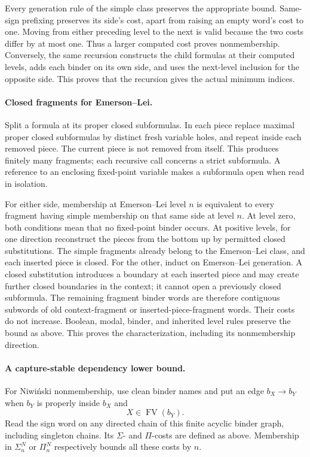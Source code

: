 Every generation rule of
the simple class preserves
the appropriate bound.
Same-sign prefixing preserves
its side's cost, apart
from raising an empty
word's cost to one.
Moving from either preceding
level to the next is valid
because the two costs differ
by at most one.
Thus a larger computed cost
proves nonmembership.
Conversely, the same recursion
constructs the child formulas
at their computed levels,
adds each binder on its
own side, and uses the
next-level inclusion for
the opposite side.
This proves that the
recursion gives the actual
minimum indices.

\paragraph{Closed fragments for Emerson--Lei.}
Split a formula at its
proper closed subformulas.
In each piece replace
maximal proper closed
subformulas by distinct
fresh variable holes, and
repeat inside each removed
piece. The current piece
is not removed from itself.
This produces finitely many
fragments; each recursive
call concerns a strict
subformula.
A reference to an enclosing
fixed-point variable makes
a subformula open when
read in isolation.

For either side, membership
at Emerson--Lei level \(n\)
is equivalent to every
fragment having simple
membership on that same
side at level \(n\).
At level zero, both conditions
mean that no fixed-point
binder occurs. At positive
levels, for one direction reconstruct
the pieces from the bottom
up by permitted closed
substitutions. The simple
fragments already belong
to the Emerson--Lei class,
and each inserted piece
is closed.
For the other, induct on
Emerson--Lei generation.
A closed substitution
introduces a boundary at
each inserted piece and
may create further closed
boundaries in the context;
it cannot open a previously
closed subformula.
The remaining fragment
binder words are therefore
contiguous subwords of old
context-fragment or inserted-piece-fragment
words. Their costs do
not increase. Boolean,
modal, binder, and inherited
level rules preserve the
bound as above.
This proves the characterization,
including its nonmembership
direction.

\paragraph{A capture-stable dependency lower bound.}
For Niwi\'nski nonmembership,
use clean binder names and
put an edge \(b_X\to b_Y\)
when \(b_Y\) is properly
inside \(b_X\) and
\[
 X\in\operatorname{FV}(b_Y).
\]
Read the sign word on
any directed chain of
this finite acyclic binder
graph, including singleton
chains. Its \(\Sigma\)-
and \(\Pi\)-costs are
defined as above.
Membership in \(\Sigma_n^N\)
or \(\Pi_n^N\) respectively
bounds all these costs
by \(n\).

